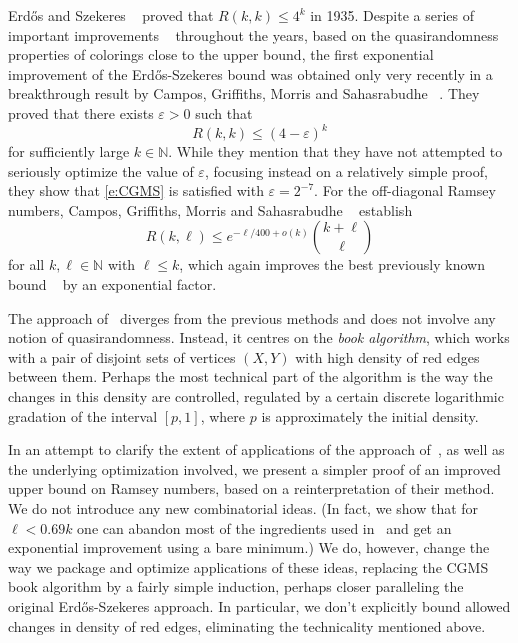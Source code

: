 \documentclass[reqno,final,12pt]{amsart}
\newcommand{\eps}{\varepsilon}
\begin{document}
Erd\H{o}s and Szekeres ~\cite{ES35} proved that $R(k,k) \leq 4^k$ in 1935. Despite a series of important improvements ~\cite{C09,S20,T88} throughout the years, based on the quasirandomness properties of colorings close to the upper bound, the first exponential improvement of the Erd\H{o}s-Szekeres bound was obtained only very recently in a breakthrough result by Campos, Griffiths, Morris and Sahasrabudhe ~\cite{CGMS23}.
They proved that  there exists $\eps > 0$ such that 
\begin{equation}\label{e:CGMS}
R(k,k) \leq (4-\eps)^k
\end{equation} for sufficiently large $k \in \mathbb{N}$. While they mention that they have not attempted to seriously optimize  the value of $\eps$, focusing instead on a relatively simple proof, they show that \eqref{e:CGMS} is satisfied with $\eps = 2^{-7}$.   For the off-diagonal Ramsey numbers, Campos, Griffiths, Morris and Sahasrabudhe ~\cite{CGMS23} establish
\begin{equation}\label{e:CGMS2}
R(k, \ell) \leq e^{-\ell/400 + o(k)}\binom{k + \ell}{\ell}
\end{equation} for all $k, \ell \in \mathbb{N}$ with $\ell \leq k$, which again improves the best previously  known bound ~\cite{S20} by an exponential factor. 

The approach of~\cite{CGMS23} diverges from the previous methods and does not involve any notion of quasirandomness. Instead, it centres on the \emph{book algorithm}, which works with a pair of disjoint sets of vertices $(X,Y)$ with high density of red edges between them. Perhaps the most technical part of the algorithm is the way the changes in this density are controlled, regulated by a certain discrete logarithmic gradation of the interval $[p,1]$, where $p$ is approximately the initial density.

In an attempt to clarify the extent of applications of the approach of~\cite{CGMS23}, as well as the underlying optimization involved, we present a simpler proof of an improved upper bound on Ramsey numbers, based on a reinterpretation of their method. We do not introduce any new  combinatorial ideas. (In fact, we show that for $\ell < 0.69k$ one can abandon most of the ingredients used in~\cite{CGMS23}  and get an exponential improvement using a bare minimum.) We do, however, change the way we package and optimize applications of these ideas, replacing the CGMS book algorithm by a fairly simple induction, perhaps  closer paralleling the original Erd\H{o}s-Szekeres approach. In particular, we don't explicitly bound allowed changes in density of red edges, eliminating the technicality mentioned above.   
\end{document}
